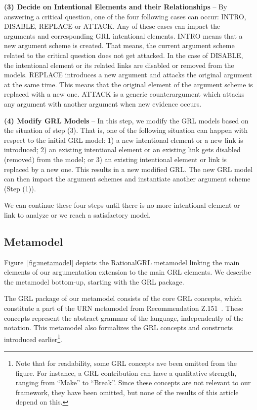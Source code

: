 \textbf{(3) Decide on Intentional Elements and their Relationships} -- By answering a critical question, one of the four following cases can occur: \textsf{INTRO}, \textsf{DISABLE}, \textsf{REPLACE} or \textsf{ATTACK}.  Any of these cases can  impact the arguments and corresponding GRL intentional elements.  \textsf{INTRO} means that 
a new argument scheme is created. That means, the current argument scheme related to the critical question does not get attacked.  In the case of \textsf{DISABLE}, the intentional element or its related links are disabled or removed from the models. \textsf{REPLACE} introduces a new argument and attacks the original argument at the same time. This means that the original element of the argument scheme is replaced with a new one.   \textsf{ATTACK} is a generic counterargument which attacks any argument with another argument when new evidence occurs.  

\textbf{(4) Modify GRL Models} -- In this step, we modify the GRL models based on the situation of step (3). That is, one of the following situation can happen with respect to the initial GRL model: 1) a new intentional element or a new link is introduced; 2) an existing intentional element or an existing link gets disabled (removed) from the model; or 3) an existing intentional element or link is replaced by a new one. This results in a new modified GRL. The new GRL model can then impact the argument schemes and instantiate another argument scheme (Step (1)).   

We can continue these four steps until there is no more intentional element or link to analyze or we reach a satisfactory model. 

\subsection{Metamodel}

Figure~\ref{fig:metamodel} depicts the RationalGRL metamodel linking the main elements of our argumentation extension to the main GRL elements. We describe the metamodel bottom-up, starting with the GRL package.

The GRL package of our metamodel consists of the core GRL concepts, which constitute a part of
the URN metamodel from Recommendation Z.151~\cite{URN}. These concepts represent the abstract grammar of the language, independently of the notation. This metamodel also formalizes the GRL concepts and constructs introduced earlier\footnote{Note that for readability, some GRL concepts ave been omitted from the figure. For instance, a GRL contribution can have a qualitative strength, ranging from ``Make'' to ``Break''. Since these concepts are not relevant to our framework, they have been omitted, but none of the results of this article depend on this.}.

